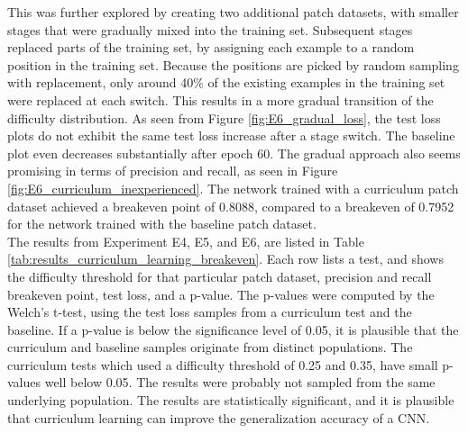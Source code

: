 This was further explored by creating two additional patch datasets, with smaller stages that were gradually mixed into the training set. Subsequent stages replaced parts of the training set, by assigning each example to a random position in the training set. Because the positions are picked by random sampling with replacement, only around 40\% of the existing examples in the training set were replaced at each switch. This results in a more gradual transition of the difficulty distribution. As seen from Figure \ref{fig:E6_gradual_loss}, the test loss plots do not exhibit the same test loss increase after a stage switch. The baseline plot even decreases substantially after epoch 60. The gradual approach also seems promising in terms of precision and recall, as seen in Figure \ref{fig:E6_curriculum_inexperienced}. The network trained with a curriculum patch dataset achieved a breakeven point of 0.8088, compared to a breakeven of 0.7952 for the network trained with the baseline patch dataset.\\



The results from Experiment E4, E5, and E6, are listed in Table \ref{tab:results_curriculum_learning_breakeven}. Each row lists a test, and shows the difficulty threshold for that particular patch dataset, precision and recall breakeven point, test loss, and a p-value. The p-values were computed by the Welch's t-test, using the test loss samples from a curriculum test and the baseline. If a p-value is below the significance level of 0.05, it is plausible that the curriculum and baseline samples originate from distinct populations. The curriculum tests which used a difficulty threshold of 0.25 and 0.35, have small p-values well below 0.05. The results were probably not sampled from the same underlying population. The results are statistically significant, and it is plausible that curriculum learning can improve the generalization accuracy of a \ac{CNN}. \\


